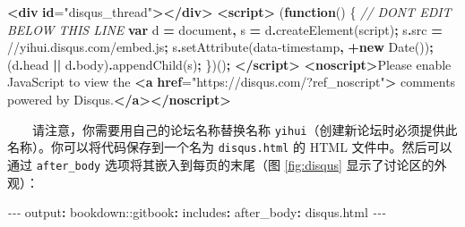 \documentclass[
  12pt,
]{krantz}
\newenvironment{Shaded}{\begin{snugshade}}{\end{snugshade}}
\newcommand{\AttributeTok}[1]{\textcolor[rgb]{0.77,0.63,0.00}{#1}}
\newcommand{\BuiltInTok}[1]{#1}
\newcommand{\CommentTok}[1]{\textcolor[rgb]{0.56,0.35,0.01}{\textit{#1}}}
\newcommand{\ErrorTok}[1]{\textcolor[rgb]{0.64,0.00,0.00}{\textbf{#1}}}
\newcommand{\FunctionTok}[1]{\textcolor[rgb]{0.00,0.00,0.00}{#1}}
\newcommand{\KeywordTok}[1]{\textcolor[rgb]{0.13,0.29,0.53}{\textbf{#1}}}
\newcommand{\NormalTok}[1]{#1}
\newcommand{\OperatorTok}[1]{\textcolor[rgb]{0.81,0.36,0.00}{\textbf{#1}}}
\newcommand{\OtherTok}[1]{\textcolor[rgb]{0.56,0.35,0.01}{#1}}
\newcommand{\PreprocessorTok}[1]{\textcolor[rgb]{0.56,0.35,0.01}{\textit{#1}}}
\newcommand{\StringTok}[1]{\textcolor[rgb]{0.31,0.60,0.02}{#1}}
\theoremstyle{definition}
\theoremstyle{definition}
\theoremstyle{definition}
\theoremstyle{definition}
\theoremstyle{remark}
\begin{document}
\begin{Shaded}
\begin{Highlighting}[]
\KeywordTok{\textless{}div} \ErrorTok{id}\OtherTok{=}\StringTok{"disqus\_thread"}\KeywordTok{\textgreater{}\textless{}/div\textgreater{}}
\KeywordTok{\textless{}script\textgreater{}}
\NormalTok{(}\KeywordTok{function}\NormalTok{() \{ }\CommentTok{// DON\textquotesingle{}T EDIT BELOW THIS LINE}
\KeywordTok{var}\NormalTok{ d }\OperatorTok{=} \BuiltInTok{document}\OperatorTok{,}\NormalTok{ s }\OperatorTok{=}\NormalTok{ d}\OperatorTok{.}\FunctionTok{createElement}\NormalTok{(}\StringTok{\textquotesingle{}script\textquotesingle{}}\NormalTok{)}\OperatorTok{;}
\NormalTok{s}\OperatorTok{.}\AttributeTok{src} \OperatorTok{=} \StringTok{\textquotesingle{}//yihui.disqus.com/embed.js\textquotesingle{}}\OperatorTok{;}
\NormalTok{s}\OperatorTok{.}\FunctionTok{setAttribute}\NormalTok{(}\StringTok{\textquotesingle{}data{-}timestamp\textquotesingle{}}\OperatorTok{,} \OperatorTok{+}\KeywordTok{new} \BuiltInTok{Date}\NormalTok{())}\OperatorTok{;}
\NormalTok{(d}\OperatorTok{.}\AttributeTok{head} \OperatorTok{||}\NormalTok{ d}\OperatorTok{.}\AttributeTok{body}\NormalTok{)}\OperatorTok{.}\FunctionTok{appendChild}\NormalTok{(s)}\OperatorTok{;}
\NormalTok{\})()}\OperatorTok{;}
\KeywordTok{\textless{}/script\textgreater{}}
\KeywordTok{\textless{}noscript\textgreater{}}\NormalTok{Please enable JavaScript to view the}
\KeywordTok{\textless{}a} \ErrorTok{href}\OtherTok{=}\StringTok{"https://disqus.com/?ref\_noscript"}\KeywordTok{\textgreater{}}
\NormalTok{  comments powered by Disqus.}\KeywordTok{\textless{}/a\textgreater{}\textless{}/noscript\textgreater{}}
\end{Highlighting}
\end{Shaded}

  请注意，你需要用自己的论坛名称替换名称 \texttt{yihui}（创建新论坛时必须提供此名称）。你可以将代码保存到一个名为 \texttt{disqus.html} 的 HTML 文件中。然后可以通过 \texttt{after\_body} 选项将其嵌入到每页的末尾（图 \ref{fig:disqus} 显示了讨论区的外观）：

\begin{Shaded}
\begin{Highlighting}[]
\PreprocessorTok{{-}{-}{-}}
\FunctionTok{output}\KeywordTok{:}
\AttributeTok{  bookdown:}\FunctionTok{:gitbook}\KeywordTok{:}
\AttributeTok{    }\FunctionTok{includes}\KeywordTok{:}
\AttributeTok{      }\FunctionTok{after\_body}\KeywordTok{:}\AttributeTok{ disqus.html}
\PreprocessorTok{{-}{-}{-}}
\end{Highlighting}
\end{Shaded}
\end{document}
